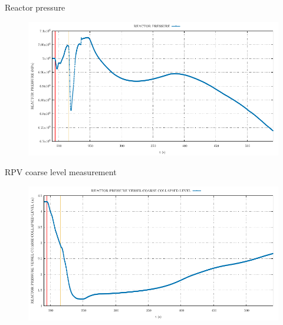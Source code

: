 \begin{frame}{Reactor pressure}
	\begin{figure}
		\centering
		\includegraphics[width=\textwidth]{./graphs/REACTOR PRESSURE_comp.pdf}
		
	\end{figure}
	
\end{frame}

\begin{frame}{RPV coarse level measurement}
	\begin{figure}
		\centering
		\includegraphics[width=\textwidth]{./graphs/REACTOR PRESSURE VESSEL COARSE COLLAPSED LEVEL_comp.pdf}
		
	\end{figure}
	
\end{frame}






